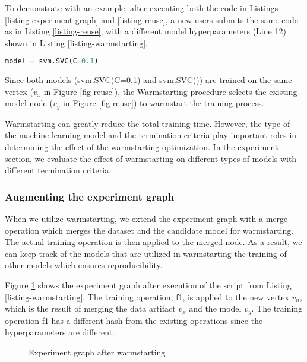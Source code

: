 To demonstrate with an example, after executing both the code in Listings \ref{listing-experiment-graph} and \ref{listing-reuse}, a new users submits the same code as in Listing \ref{listing-reuse}, with a different model hyperparameters (Line 12) shown in Listing \ref{listing-warmstarting}.
\begin{lstlisting}[language=Python, firstnumber=12, caption= Workload with different hyperparameters,captionpos=b,label = {listing-warmstarting}]
model = svm.SVC(C=0.1)
\end{lstlisting}
Since both models (svm.SVC(C=0.1) and svm.SVC()) are trained on the same vertex ($v_x$ in Figure \ref{fig-reuse}), the Warmstarting procedure selects the existing model node ($v_y$ in Figure \ref{fig-reuse}) to warmstart the training process.

Warmstarting can greatly reduce the total training time.
However, the type of the machine learning model and the termination criteria play important roles in determining the effect of the warmstarting optimization.
In the experiment section, we evaluate the effect of warmstarting on different types of models with different termination criteria.

\subsubsection{Augmenting the experiment graph}
When we utilize warmstarting, we extend the experiment graph with a merge operation which merges the dataset and the candidate model for warmstarting.
The actual training operation is then applied to the merged node.
As a result, we can keep track of the models that are utilized in warmstarting the training of other models which ensures reproducibility.

Figure \ref{fig-warmstarting} shows the experiment graph after execution of the script from Listing \ref{listing-warmstarting}.
The training operation, f1, is applied to the new vertex $v_n$, which is the result of merging the data artifact $v_x$ and the model $v_y$.
The training operation f1 has a different hash from the existing operations since the hyperparameters are different.

\begin{figure}[t]
\centering

\caption{Experiment graph after warmstarting} %
\label{fig-warmstarting}
\end{figure}

